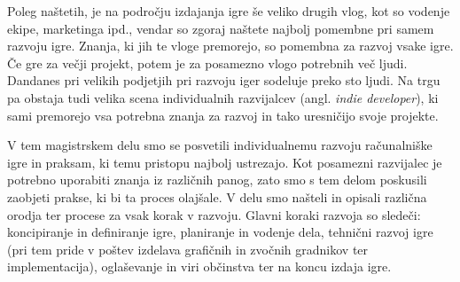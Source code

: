 \documentclass[12pt,a4paper,twoside]{book}
\begin{document}
Poleg naštetih, je na področju izdajanja igre še veliko drugih vlog, kot so vodenje ekipe, marketinga ipd., vendar so zgoraj naštete najbolj pomembne pri samem razvoju igre. Znanja, ki jih te vloge premorejo, so pomembna za razvoj vsake igre. Če gre za večji projekt, potem je za posamezno vlogo potrebnih več ljudi. Dandanes pri velikih podjetjih pri razvoju iger sodeluje preko sto ljudi. Na trgu pa obstaja tudi velika scena individualnih razvijalcev (angl. \textit{indie developer}), ki sami premorejo vsa potrebna znanja za razvoj in tako uresničijo svoje projekte. 

V tem magistrskem delu smo se posvetili individualnemu razvoju računalniške igre in praksam, ki temu pristopu najbolj ustrezajo. Kot posamezni razvijalec je potrebno uporabiti znanja iz različnih panog, zato smo s tem delom poskusili zaobjeti prakse, ki bi ta proces olajšale. V delu smo našteli in opisali različna orodja ter procese za vsak korak v razvoju. Glavni koraki razvoja so sledeči: koncipiranje in definiranje igre, planiranje in vodenje dela, tehnični razvoj igre (pri tem pride v poštev izdelava grafičnih in zvočnih gradnikov ter implementacija), oglaševanje in viri občinstva ter na koncu izdaja igre.
\end{document}
